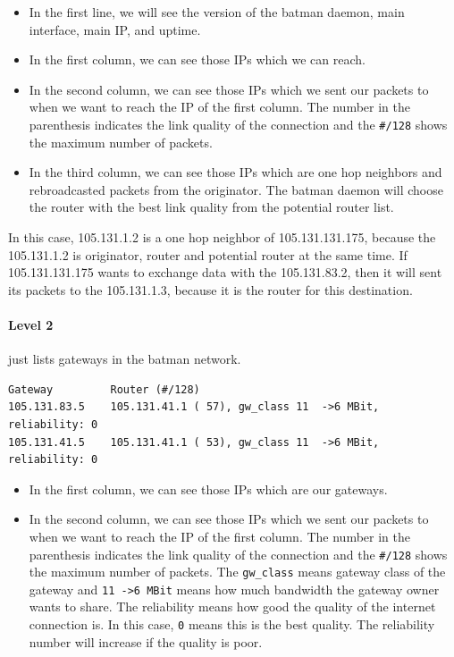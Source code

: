 \documentclass[
	12pt,
	a4paper,
	twoside,
	english,
	headsepline,
	footnosepline,
	automark,
	normalheadings,
	openany,
	cleardoubleplain,
	abstracton,
	idxtotoc,
	liststotoc,
	bibtotoc,
 	BCOR8mm,
]{scrartcl}
\begin{document}
\begin{itemize}
\item In the first line, we will see the version of the batman daemon, main interface, main  IP, and uptime.
\item In the first column, we can see those IPs which we can reach.
\item In the second column, we can see those IPs which we sent our packets to when we  want to reach the IP of the first column. The number in the parenthesis indicates the  link quality of the connection and the \verb|#/128| shows the maximum number of packets.
\item In the third column, we can see those IPs which are one hop neighbors and  rebroadcasted packets from the originator. The batman daemon will choose the router  with the best link quality from the potential router list.
\end{itemize}

In this case, 105.131.1.2 is a one hop neighbor of 105.131.131.175, because the 105.131.1.2  is  originator, router and potential router at the same time. If 105.131.131.175 wants to exchange  data with the 105.131.83.2, then it will sent its packets to the 105.131.1.3, because it is the  router for this destination.

\paragraph*{Level 2}
just lists gateways in the batman network.

\begin{lstlisting}[basicstyle=\footnotesize,	frame=single, columns= flexible]
Gateway         Router (#/128)
105.131.83.5    105.131.41.1 ( 57), gw_class 11  ->6 MBit, reliability: 0
105.131.41.5    105.131.41.1 ( 53), gw_class 11  ->6 MBit, reliability: 0
\end{lstlisting}

\begin{itemize}
\item In the first column, we can see those IPs  which are our gateways.
\item In the second column, we can see those IPs which we sent our packets to when we  want to reach the IP of the first column. The number in the parenthesis indicates the  link quality of the connection and the \verb|#/128| shows the maximum number of packets.  The \verb|gw_class| means gateway class of the gateway and \verb|11 ->6 MBit| means how  much bandwidth the gateway owner wants to share. The reliability means how good  the quality of the internet connection is. In this case, \verb|0| means this is the best  quality. The reliability number will increase if the quality is poor.
\end{itemize}
\end{document}
